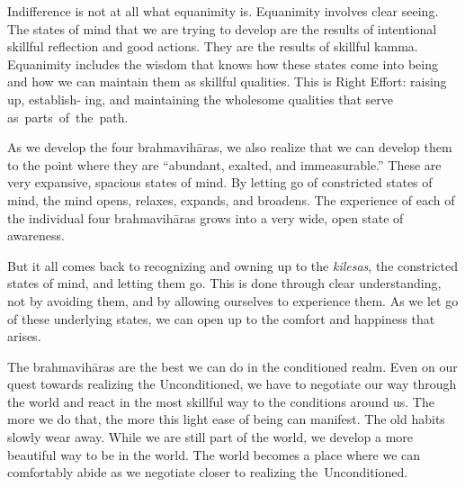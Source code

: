 Indifference is not at all what equanimity is. Equanimity involves clear seeing. The states of mind that we are trying to develop are the results of intentional skillful reflection and good actions. They are the results of skillful kamma. Equanimity includes the wisdom that knows how these states come into being and how we can maintain them as skillful qualities. This is Right Effort: raising up, establish- \linebreak ing, and maintaining the wholesome qualities that serve \mbox{as parts of the path.}

As we develop the four brahmavihāras, we also realize that we can develop them to the point where they are ``abundant, exalted, and immeasurable.'' These are very expansive, spacious states of mind. By letting go of constricted states of mind, the mind opens, relaxes, expands, and broadens. The experience of each of the individual four brahmavihāras grows into a very wide, open state of awareness.

But it all comes back to recognizing and owning up to the \emph{kilesas}, the constricted states of mind, and letting them go. This is done through clear understanding, not by avoiding them, and by allowing ourselves to experience them. As we let go of these underlying states, we can open up to the comfort and happiness that arises.

The brahmavihāras are the best we can do in the conditioned realm. Even on our quest towards realizing the Unconditioned, we have to negotiate our way through the world and react in the most skillful way to the conditions around us. The more we do that, the more this light ease of being can manifest. The old habits slowly wear away. While we are still part of the world, we develop a more beautiful way to be in the world. The world becomes a place where we can comfortably abide as we negotiate closer to realizing \mbox{the Unconditioned.}
